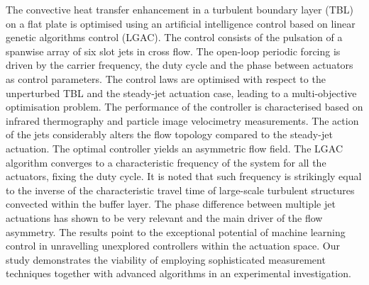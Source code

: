 %
\graphicspath{{paper5/}}%
%
%
%
\begin{paper}

\makepapertitle

%
\begin{paperabstract}
The convective heat transfer enhancement in a turbulent boundary layer (TBL) on a flat plate is optimised using an artificial intelligence control based on linear genetic algorithms control (LGAC). The control consists of the pulsation of a spanwise array of six slot jets in cross flow. The open-loop periodic forcing is driven by the carrier frequency, the duty cycle and the phase between actuators as control parameters. The control laws are optimised with respect to the unperturbed TBL and the steady-jet actuation case, leading to a multi-objective optimisation problem. The performance of the controller is characterised based on infrared thermography and particle image velocimetry measurements. The action of the jets considerably alters the flow topology compared to the steady-jet actuation. The optimal controller yields an asymmetric flow field. The LGAC algorithm converges to a characteristic frequency of the system for all the actuators, fixing the duty cycle. It is noted that such frequency is strikingly equal to the inverse of the characteristic travel time of large-scale turbulent structures convected within the buffer layer. The phase difference between multiple jet actuations has shown to be very relevant and the main driver of the flow asymmetry. The results point to the exceptional potential of machine learning control in unravelling unexplored controllers within the actuation space. Our study demonstrates the viability of employing sophisticated measurement techniques together with advanced algorithms in an experimental investigation.

\end{paperabstract}


%



%


%


\end{paper}
